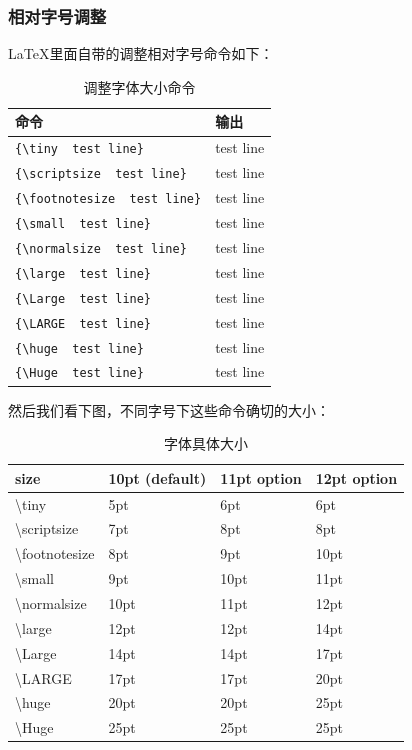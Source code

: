 \documentclass[11pt,oneside]{book}
\begin{document}
\begin{common-format}
\subsubsection{相对字号调整}
\LaTeX 里面自带的调整相对字号命令如下：
\begin{table}[H]
\label{tab:调整字体大小命令}
\begin{tabular}{|l|l|}
\hline
命令 & 输出\\
\hline
\verb+{\tiny  test line}+ & {\tiny  test line}\\
\verb+{\scriptsize  test line}+ & {\scriptsize  test line}\\
\verb+{\footnotesize  test line}+ & {\footnotesize  test line}\\
\verb+{\small  test line}+ & {\small test line}\\
\verb+{\normalsize  test line}+ & {\normalsize  test line}\\
\verb+{\large  test line}+ & {\large  test line}\\
\verb+{\Large  test line}+ & {\Large  test line}\\
\verb+{\LARGE  test line}+ & {\LARGE  test line}\\
\verb+{\huge  test line}+ & {\huge  test line}\\
\verb+{\Huge  test line}+ & {\Huge  test line}\\
\hline
\end{tabular}
\caption{调整字体大小命令}
\end{table}

然后我们看下图，不同字号下这些命令确切的大小：

\begin{table}[H]
\begin{tabular}{@{}llll@{}}
\toprule 
size          & 10pt (default) & 11pt option & 12pt option \\ \midrule
\textbackslash tiny         & 5pt            & 6pt         & 6pt         \\
\textbackslash scriptsize   & 7pt            & 8pt         & 8pt         \\
\textbackslash footnotesize & 8pt            & 9pt         & 10pt        \\
\textbackslash small        & 9pt            & 10pt        & 11pt        \\
\textbackslash normalsize   & 10pt           & 11pt        & 12pt        \\
\textbackslash large        & 12pt           & 12pt        & 14pt        \\
\textbackslash Large        & 14pt           & 14pt        & 17pt        \\
\textbackslash LARGE        & 17pt           & 17pt        & 20pt        \\
\textbackslash huge         & 20pt           & 20pt        & 25pt        \\
\textbackslash Huge         & 25pt           & 25pt        & 25pt        \\ \bottomrule
\end{tabular}
\label{tab:字体具体大小}
\caption{字体具体大小}
\end{table}



\end{common-format}
\end{document}
